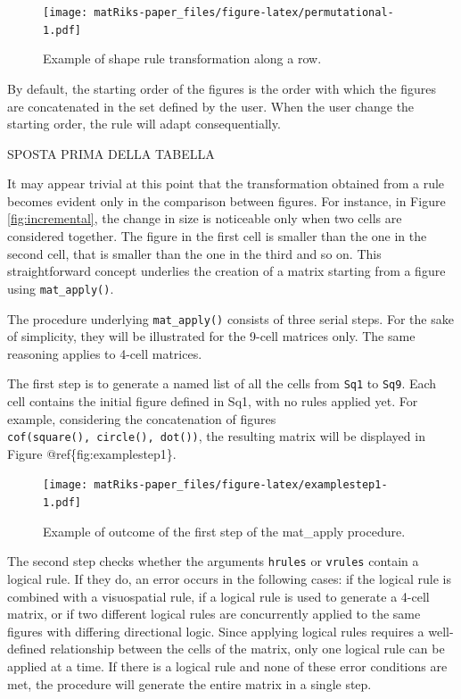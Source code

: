 \begin{figure}
\centering
\texttt{[image: matRiks-paper\_files/figure-latex/permutational-1.pdf]}
\caption{\label{fig:permutational}Example of shape rule transformation along a row.}
\end{figure}

By default, the starting order of the figures is the order with which the figures are concatenated in the set defined by the user.
When the user change the starting order, the rule will adapt consequentially.

SPOSTA PRIMA DELLA TABELLA

It may appear trivial at this point that the transformation obtained from a rule becomes evident only in the comparison between figures.
For instance, in Figure \ref{fig:incremental}, the change in size is noticeable only when two cells are considered together.
The figure in the first cell is smaller than the one in the second cell, that is smaller than the one in the third and so on.
This straightforward concept underlies the creation of a matrix starting from a figure using \texttt{mat\_apply()}.

The procedure underlying \texttt{mat\_apply()} consists of three serial steps.
For the sake of simplicity, they will be illustrated for the 9-cell matrices only.
The same reasoning applies to 4-cell matrices.

The first step is to generate a named list of all the cells from \texttt{Sq1} to \texttt{Sq9}.
Each cell contains the initial figure defined in Sq1, with no rules applied yet.
For example, considering the concatenation of figures \texttt{cof(square(),\ circle(),\ dot())}, the resulting matrix will be displayed in Figure @ref\{fig:examplestep1\}.

\begin{figure}
\centering
\texttt{[image: matRiks-paper\_files/figure-latex/examplestep1-1.pdf]}
\caption{\label{fig:examplestep1}Example of outcome of the first step of the mat\_apply procedure.}
\end{figure}

The second step checks whether the arguments \texttt{hrules} or \texttt{vrules} contain a logical rule.
If they do, an error occurs in the following cases: if the logical rule is combined with a visuospatial rule, if a logical rule is used to generate a 4-cell matrix, or if two different logical rules are concurrently applied to the same figures with differing directional logic.
Since applying logical rules requires a well-defined relationship between the cells of the matrix, only one logical rule can be applied at a time.
If there is a logical rule and none of these error conditions are met, the procedure will generate the entire matrix in a single step.

